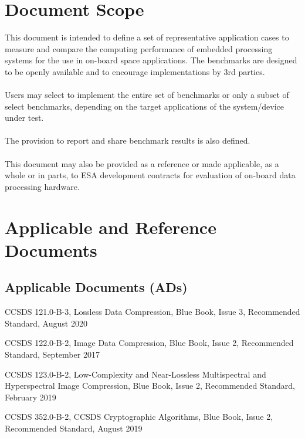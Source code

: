 \documentclass{report}
\def\twodigits#1{%
\ifnum#1<10 0\fi 
\number#1}
\begin{document}
\section{Document Scope}
This document is intended to define a set of representative application cases to measure and compare the computing performance of embedded processing systems for the use in on-board space applications. The benchmarks are designed to be openly available and to encourage implementations by 3rd parties.
\\ \\
Users may select to implement the entire set of benchmarks or only a subset of select benchmarks, depending on the target applications of the system/device under test.
\\ \\
The provision to report and share benchmark results is also defined.
\\ \\
This document may also be provided as a reference or made applicable, as a whole or in parts, to ESA development contracts for evaluation of on-board data processing hardware. 

\newpage
\section{Applicable and Reference Documents}
\subsection{Applicable Documents (ADs)}

\begin{enumerate}[label={[AD-\protect\twodigits{\theenumi}]}]
    \item \label{ad:ccsds121} CCSDS 121.0-B-3, Lossless Data Compression, Blue Book, Issue 3, Recommended Standard, August 2020 
    \item \label{ad:ccsds122} CCSDS 122.0-B-2, Image Data Compression, Blue Book, Issue 2, Recommended Standard, September 2017
    \item \label{ad:ccsds123} CCSDS 123.0-B-2, Low-Complexity and Near-Lossless Multispectral and Hyperspectral Image Compression, Blue Book, Issue 2, Recommended Standard, February 2019
    \item \label{ad:ccsds352} CCSDS 352.0-B-2, CCSDS Cryptographic Algorithms, Blue Book, Issue 2, Recommended Standard, August 2019
    
\end{enumerate}
\end{document}
